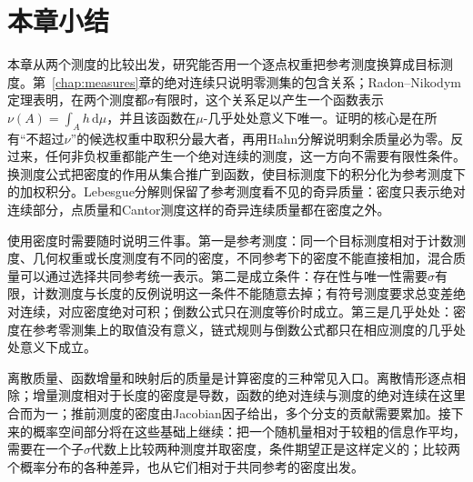 \section{本章小结}
\label{sec:density-summary}

本章从两个测度的比较出发，研究能否用一个逐点权重把参考测度换算成目标测度。第~\ref{chap:measures}章的绝对连续只说明零测集的包含关系；Radon–Nikodym定理表明，在两个测度都$\sigma$有限时，这个关系足以产生一个函数表示$\nu(A)=\int_Ah\,\mathrm d\mu$，并且该函数在$\mu$-几乎处处意义下唯一。证明的核心是在所有“不超过$\nu$”的候选权重中取积分最大者，再用Hahn分解说明剩余质量必为零。反过来，任何非负权重都能产生一个绝对连续的测度，这一方向不需要有限性条件。换测度公式把密度的作用从集合推广到函数，使目标测度下的积分化为参考测度下的加权积分。Lebesgue分解则保留了参考测度看不见的奇异质量：密度只表示绝对连续部分，点质量和Cantor测度这样的奇异连续质量都在密度之外。

使用密度时需要随时说明三件事。第一是参考测度：同一个目标测度相对于计数测度、几何权重或长度测度有不同的密度，不同参考下的密度不能直接相加，混合质量可以通过选择共同参考统一表示。第二是成立条件：存在性与唯一性需要$\sigma$有限，计数测度与长度的反例说明这一条件不能随意去掉；有符号测度要求总变差绝对连续，对应密度绝对可积；倒数公式只在测度等价时成立。第三是几乎处处：密度在参考零测集上的取值没有意义，链式规则与倒数公式都只在相应测度的几乎处处意义下成立。

离散质量、函数增量和映射后的质量是计算密度的三种常见入口。离散情形逐点相除；增量测度相对于长度的密度是导数，函数的绝对连续与测度的绝对连续在这里合而为一；推前测度的密度由Jacobian因子给出，多个分支的贡献需要累加。接下来的概率空间部分将在这些基础上继续：把一个随机量相对于较粗的信息作平均，需要在一个子$\sigma$代数上比较两种测度并取密度，条件期望正是这样定义的；比较两个概率分布的各种差异，也从它们相对于共同参考的密度出发。
